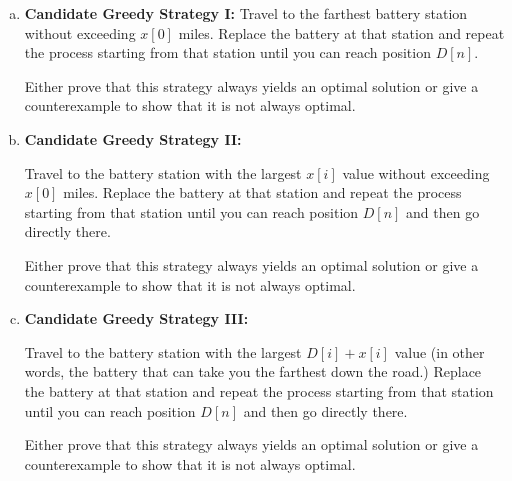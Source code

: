 \documentclass[10pt,letterpaper,unboxed,cm]{article}
\begin{document}
\begin{enumerate}
\begin{enumerate}[a)]
\item
{\bf Candidate Greedy Strategy I:} Travel to the farthest battery station without exceeding $x[0]$ miles. Replace the battery at that station and repeat the process starting from that station until you can reach position $D[n]$.

Either prove that this strategy always yields an optimal solution or give a counterexample to show that it is not always optimal.

\item
{\bf Candidate Greedy Strategy II:}

Travel to the battery station with the largest $x[i]$ value without exceeding $x[0]$ miles. Replace the battery at that station and repeat the process starting from that station until you can reach position $D[n]$ and then go directly there.

Either prove that this strategy always yields an optimal solution or give a counterexample to show that it is not always optimal.

\item
{\bf Candidate Greedy Strategy III:} 

Travel to the battery station with the largest $D[i] + x[i]$ value (in other words, the battery that can take you the farthest down the road.) Replace the battery at that station and repeat the process starting from that station until you can reach position $D[n]$ and then go directly there.

Either prove that this strategy always yields an optimal solution or give a counterexample to show that it is not always optimal.

\end{enumerate}






\end{enumerate}
\end{document}
